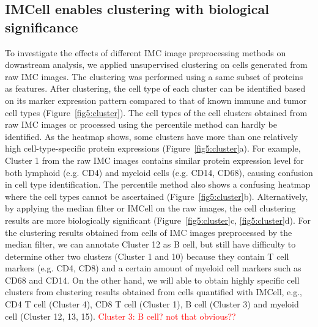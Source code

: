 \documentclass{mynature}
\begin{document}
\subsection{IMCell enables clustering with biological significance}
To investigate the effects of different IMC image preprocessing methods on downstream analysis, we applied unsupervised clustering on cells generated from raw IMC images.
The clustering was performed using a same subset of proteins as features. 
After clustering, the cell type of each cluster can be identified based on its marker expression pattern compared to that of known immune and tumor cell types (Figure~\ref{fig5:cluster}). 
The cell types of the cell clusters obtained from raw IMC images or processed using the percentile method can hardly be identified. 
As the heatmap shows, some clusters have more than one relatively high cell-type-specific protein expressions (Figure~\ref{fig5:cluster}a). For example, Cluster 1 from the raw IMC images contains similar protein expression level for both lymphoid (e.g. CD4) and myeloid cells (e.g. CD14, CD68), causing confusion in cell type identification. 
The percentile method also shows a confusing heatmap where the cell types cannot be ascertained (Figure~\ref{fig5:cluster}b). 
Alternatively, by applying the median filter or IMCell on the raw images, the cell clustering results are more biologically significant (Figure~\ref{fig5:cluster}c, \ref{fig5:cluster}d). 
For the clustering results obtained from cells of IMC images preprocessed by the median filter, we can annotate Cluster 12 as B cell, but still have difficulty to determine other two clusters (Cluster 1 and 10) because they contain T cell markers (e.g. CD4, CD8) and a certain amount of myeloid cell markers such as CD68 and CD14.   
On the other hand, we will able to obtain highly specific cell clusters from clustering results obtained from cells quantified with IMCell, e.g., CD4 T cell (Cluster 4), CD8 T cell (Cluster 1), B cell (Cluster 3) and myeloid cell (Cluster 12, 13, 15). 
\textcolor{red}{Cluster 3: B cell? not that obvious??}
\end{document}
